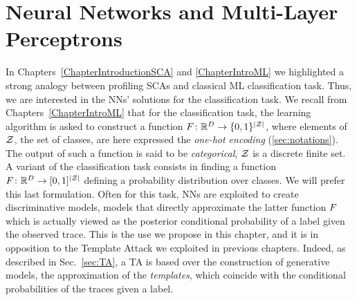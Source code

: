 


\section{Neural Networks and Multi-Layer Perceptrons}\label{sec:MLP}
In Chapters~\ref{ChapterIntroductionSCA} and \ref{ChapterIntroML} we highlighted a strong analogy between profiling SCAs and classical ML classification task. Thus, we are interested in the NNs' solutions for the classification task. We recall from Chapters~\ref{ChapterIntroML} that for the classification task, the learning algorithm is asked to construct a function $F\colon \mathbb{R}^D \rightarrow \{0,1\}^{\lvert\mathcal{Z}\rvert}$, where elements of $\mathcal{Z}$, \ie the set of classes, are here expressed \via the \emph{one-hot encoding} (\ref{sec:notations}). The output of such a function is said to be \emph{categorical}, \ie $\mathcal{Z}$ is a discrete finite set. A variant of the classification task consists in finding a function $F\colon \mathbb{R}^D \rightarrow [0,1]^{\lvert\mathcal{Z}\rvert}$ defining a probability distribution over classes. We will prefer this last formulation. Often for this task, NNs are exploited to create discriminative models, \ie models that directly approximate the latter function $F$ which is actually viewed as the posterior conditional probability of a label given the observed trace. This is the use we propose in this chapter, and it is in opposition to the Template Attack we exploited in previous chapters. Indeed, as described in Sec.~\ref{sec:TA}, a TA is based over the construction of generative models, \ie the approximation of the \emph{templates}, which coincide with the conditional probabilities of the traces given a label. \\

